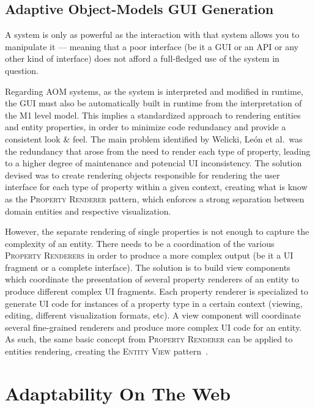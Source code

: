 \subsection{Adaptive Object-Models GUI Generation}\label{sec:aom_gui_generation}

A system is only as powerful as the interaction with that system allows you to manipulate it --- meaning that a poor interface (be it a GUI or an API or any other kind of interface) does not afford a full-fledged use of the system in question.

Regarding AOM systems, as the system is interpreted and modified in runtime, the GUI must also be automatically built in runtime from the interpretation of the M1 level model. This implies a standardized approach to rendering entities and entity properties, in order to minimize code redundancy and provide a consistent look \& feel. The main problem identified by Welicki, León et al.\ was the redundancy that arose from the need to render each type of property, leading to a higher degree of maintenance and potencial UI inconsistency. The solution devised was to create rendering objects responsible for rendering the user interface for each type of property within a given context, creating what is know as the \textsc{Property Renderer} pattern, which enforces a strong separation between domain entities and respective visualization.

However, the separate rendering of single properties is not enough to capture the complexity of an entity. There needs to be a coordination of the various \textsc{Property Renderers} in order to produce a more complex output (be it a UI fragment or a complete interface). The solution is to build view components which coordinate the presentation of several property renderers of an entity to produce different complex UI fragments. Each property renderer is specialized to generate UI code for instances of a property type in a certain context (viewing, editing, different visualization formats, etc). A view component will coordinate several fine-grained renderers and produce more complex UI code for an entity. As such, the same basic concept from \textsc{Property Renderer} can be applied to entities rendering, creating the \textsc{Entity View} pattern~\cite{WYW07}. %

\section{Adaptability On The Web}\label{sec:web_adaptability}

